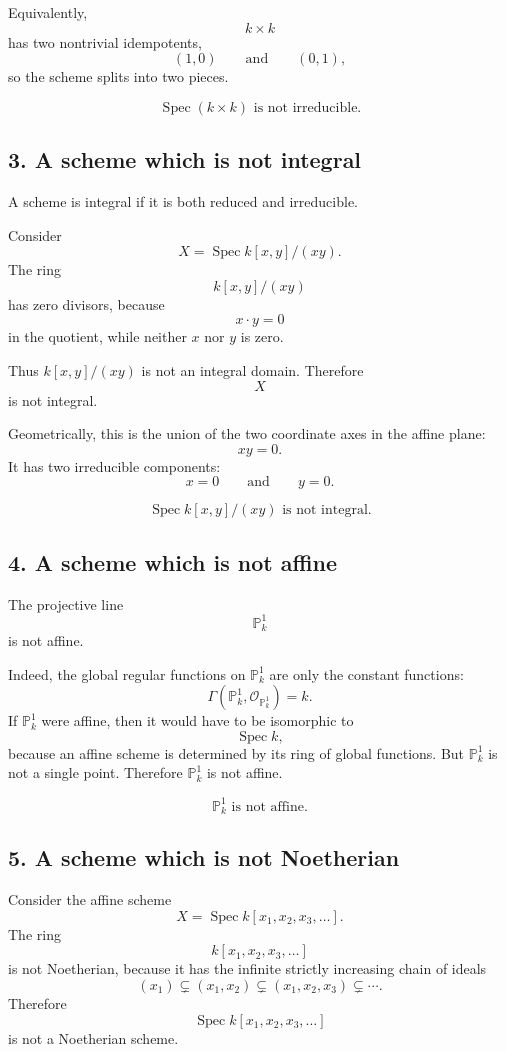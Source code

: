 \documentclass[12pt,a4paper]{article}
\theoremstyle{notespace}
\begin{document}
Equivalently,
\[
k\times k
\]
has two nontrivial idempotents,
\[
(1,0)
\qquad\text{and}\qquad
(0,1),
\]
so the scheme splits into two pieces.

\[
\boxed{
	\operatorname{Spec}(k\times k)
	\text{ is not irreducible.}
}
\]

\subsection*{3. A scheme which is not integral}

A scheme is integral if it is both reduced and irreducible.

Consider
\[
X=\operatorname{Spec} k[x,y]/(xy).
\]
The ring
\[
k[x,y]/(xy)
\]
has zero divisors, because
\[
x\cdot y=0
\]
in the quotient, while neither \(x\) nor \(y\) is zero.

Thus \(k[x,y]/(xy)\) is not an integral domain. Therefore
\[
X
\]
is not integral.

Geometrically, this is the union of the two coordinate axes in the affine plane:
\[
xy=0.
\]
It has two irreducible components:
\[
x=0
\qquad\text{and}\qquad
y=0.
\]

\[
\boxed{
	\operatorname{Spec} k[x,y]/(xy)
	\text{ is not integral.}
}
\]

\subsection*{4. A scheme which is not affine}

The projective line
\[
\mathbb{P}^1_k
\]
is not affine.

Indeed, the global regular functions on \(\mathbb{P}^1_k\) are only the constant functions:
\[
\Gamma(\mathbb{P}^1_k,\mathcal{O}_{\mathbb{P}^1_k})=k.
\]
If \(\mathbb{P}^1_k\) were affine, then it would have to be isomorphic to
\[
\operatorname{Spec} k,
\]
because an affine scheme is determined by its ring of global functions. But \(\mathbb{P}^1_k\) is not a single point. Therefore \(\mathbb{P}^1_k\) is not affine.

\[
\boxed{
	\mathbb{P}^1_k
	\text{ is not affine.}
}
\]

\subsection*{5. A scheme which is not Noetherian}

Consider the affine scheme
\[
X=\operatorname{Spec} k[x_1,x_2,x_3,\dots].
\]
The ring
\[
k[x_1,x_2,x_3,\dots]
\]
is not Noetherian, because it has the infinite strictly increasing chain of ideals
\[
(x_1)
\subsetneq
(x_1,x_2)
\subsetneq
(x_1,x_2,x_3)
\subsetneq
\cdots.
\]
Therefore
\[
\operatorname{Spec} k[x_1,x_2,x_3,\dots]
\]
is not a Noetherian scheme.
\end{document}
